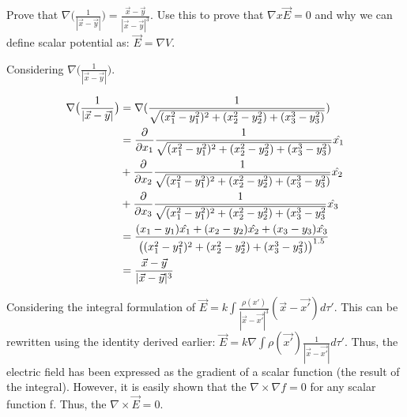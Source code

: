 \begin{homeworkProblem}

Prove that $\nabla \big( \frac{1}{|\vec{x}-\vec{y}|}\big) = \frac{\vec{x}-\vec{y}}{|\vec{x}-\vec{y}|^3}$. Use this to prove that $\nabla x \vec{E} = 0$ and why we can define scalar potential as: $\vec{E} = \nabla V$.

Considering $\nabla \big( \frac{1}{|\vec{x}-\vec{y}|}\big)$.

\begin{align}
\nabla \big( \frac{1}{|\vec{x}-\vec{y}|}\big) &= \nabla( \frac{1}{\sqrt{(x_1^2-y_1^2)^2+(x_2^2-y_2^2)+(x_3^3-y_3^2)}} ) \nonumber \\
&= \dfrac{\partial}{\partial x_1}  \frac{1}{\sqrt{(x_1^2-y_1^2)^2+(x_2^2-y_2^2)+(x_3^3-y_3^2)}}\hat{x_1} \nonumber \\ & + \dfrac{\partial}{\partial x_2}\frac{1}{\sqrt{(x_1^2-y_1^2)^2+(x_2^2-y_2^2)+(x_3^3-y_3^2)}}\hat{x_2} \nonumber \\ &+ \dfrac{\partial}{\partial x_3}  \frac{1}{\sqrt{(x_1^2-y_1^2)^2+(x_2^2-y_2^2)+(x_3^3-y_3^2}}\hat{x_3} \nonumber \\
&= \frac{(x_1 - y_1)\hat{x_1} + (x_2 - y_2) \hat{x_2} + (x_3 - y_3) \hat{x_3}}{\big((x_1^2-y_1^2)^2+(x_2^2-y_2^2)+(x_3^3-y_3^2)\big)^{1.5}} \nonumber \\
&= \frac{\vec{x}-\vec{y}}{|\vec{x}-\vec{y}|^3} \nonumber
\end{align}

Considering the integral formulation of $\vec{E} = k \int \frac{\rho(x')}{|\vec{x}-\vec{x'}|^3}(\vec{x}-\vec{x'})d\tau'$. This can be rewritten using the identity derived earlier: $\vec{E} = k \nabla \int \rho(\vec{x'})\frac{1}{|\vec{x}-\vec{x'}|} d\tau'$. Thus, the electric field has been expressed as the gradient of a scalar function (the result of the integral). However, it is easily shown that the $\nabla \times \nabla f = 0$ for any scalar function f. Thus, the $\nabla \times \vec{E} = 0$.

\end{homeworkProblem}